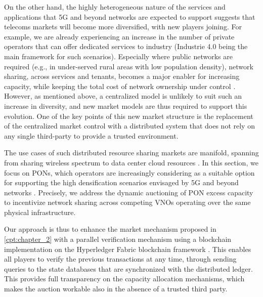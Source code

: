 On the other hand, the highly heterogeneous nature of the services and applications that \ac{5G} and beyond networks are expected to support suggests that telecoms markets will become more diversified, with new players joining. For example, we are already experiencing an increase in the number of private operators that can offer dedicated services to industry (Industrie 4.0 being the main framework for such scenarios).
Especially where public networks are required (e.g., in under-served rural areas with low population density), network sharing, across services and tenants, becomes a major enabler for increasing capacity, while keeping the total cost of network ownership under control \cite{6035827}.
However, as mentioned above, a centralized model is unlikely to suit such an increase in diversity, and new market models are thus required to support this evolution.
One of the key points of this new market structure is the replacement of the centralized market control with a distributed system that does not rely on any single third-party to provide a trusted environment.

The use cases of such distributed resource sharing markets are manifold, spanning from sharing wireless spectrum \cite{7194843} to data center cloud resources \cite{7296648}. In this section, we focus on \acp{PON}, which operators are increasingly considering as a suitable option for supporting the high densification scenarios envisaged by \ac{5G} and beyond networks \cite{6886953}.
Precisely, we address the dynamic auctioning of \ac{PON} excess capacity to incentivize network sharing across competing \acp{VNO} operating over the same physical infrastructure.

Our approach is thus to enhance the market mechanism proposed in \autoref{cpt:chapter_2} with a parallel verification mechanism using a blockchain implementation on the Hyperledger Fabric blockchain framework \cite{fabric}. This enables all players to verify the previous transactions at any time, through sending queries to the state databases that are synchronized with the distributed ledger. This provides full transparency on the capacity allocation mechanisms, which makes the auction workable also in the absence of a trusted third party.

